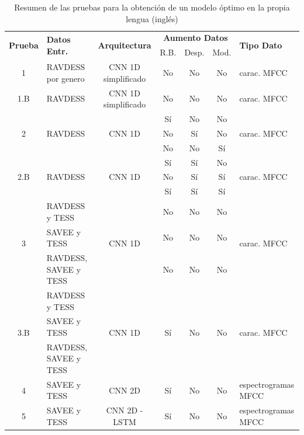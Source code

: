 \documentclass[11pt,a4paper,spanish]{book}
\begin{document}
	\begin{table}[H]
	\centering
	\begin{center}
		\begin{tabular}{| c | p{3.5cm} | c | c c c | p{3.5cm} |}
			\hline
			\multirow{2}{*}{\textbf{Prueba}} &\multirow{2}{*}{\textbf{Datos Entr.}}& \multirow{2}{*}{\textbf{Arquitectura}} & 
			\multicolumn{3}{|c|}{\textbf{Aumento Datos}} & 
			\multirow{2}{*}{\textbf{Tipo Dato}} \\ \cline{4-6}
			& & & R.B. & Desp. & Mod. & \\ 
			\hline \hline
			
			1 & RAVDESS por genero & CNN 1D simplificado & No &No &No & carac. MFCC	\\ \hline
			1.B & RAVDESS & CNN 1D simplificado &No &No &No & carac. MFCC\\ \hline
			\multirow{3}{*}{2} & \multirow{3}{*}{RAVDESS} & \multirow{3}{*}{CNN 1D} &Sí &No &No  & \multirow{3}{*}{carac. MFCC}\\
			& & & No &Sí &No & 	\\
			& & & No &No &Sí  & 	\\ \hline
			
			\multirow{3}{*}{2.B} & \multirow{3}{*}{RAVDESS} & \multirow{3}{*}{CNN 1D } & Sí &Sí &No & \multirow{3}{*}{carac. MFCC}\\
			
			& &  & No &Sí &Sí & \\
			& &  & Sí &Sí &Sí& \\ \hline
			
			\multirow{3}{*}{3} & RAVDESS y TESS & \multirow{3}{*}{CNN 1D} &  No &No &No & \multirow{3}{*}{carac. MFCC}	\\ 
			\cline{2-2}
			& SAVEE y TESS &  &  No &No &No & 	\\
			\cline{2-2}
			& RAVDESS, SAVEE y TESS &  &  No &No &No & 	\\ \hline
			
			\multirow{3}{*}{3.B} & RAVDESS y TESS & \multirow{3}{*}{CNN 1D} & \multirow{3}{*}{ Sí}&\multirow{3}{*}{ No} & \multirow{3}{*}{ No} & \multirow{3}{*}{carac. MFCC}	\\
			& SAVEE y TESS &  & &&  & 	\\
			& RAVDESS, SAVEE y TESS &  & &&  & 	\\\hline
			
			4 & SAVEE y TESS & CNN 2D &Sí &No &No & espectrogramas MFCC\\ \hline
			5 & SAVEE y TESS & CNN 2D - LSTM &Sí &No &No & espectrogramas MFCC\\ \hline
			
		\end{tabular}
		
		\caption{Resumen de las pruebas para la obtención de un modelo óptimo en la propia lengua (inglés)}
		\label{tab:resumenTests1}
		\end{center}
	\end{table}
\end{document}
